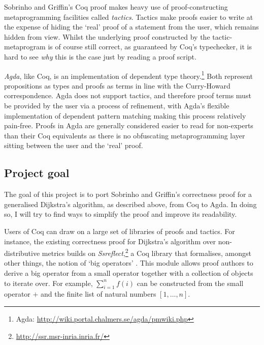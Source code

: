 \documentclass[a4paper]{scrartcl}
\begin{document}
Sobrinho and Griffin's Coq proof makes heavy use of proof-constructing metaprogramming facilities called \emph{tactics}.
Tactics make proofs easier to write at the expense of hiding the `real' proof of a statement from the user, which remains hidden from view.
Whilst the underlying proof constructed by the tactic-metaprogram is of course still correct, as guaranteed by Coq's typechecker, it is hard to see \emph{why} this is the case just by reading a proof script.

\emph{Agda}, like Coq, is an implementation of dependent type theory.\footnote{Agda: \url{http://wiki.portal.chalmers.se/agda/pmwiki.php}} Both represent propositions as types and proofs as terms in line with the Curry-Howard correspondence.
Agda does not support tactics, and therefore proof terms must be provided by the user via a process of refinement, with Agda's flexible implementation of dependent pattern matching making this process relatively pain-free. Proofs in Agda are generally considered easier to read for non-experts than their Coq equivalents as there is no obfuscating metaprogramming layer sitting between the user and the `real' proof.

\subsection{Project goal}

The goal of this project is to port Sobrinho and Griffin's correctness proof for a generalised Dijkstra's algorithm, as described above, from Coq to Agda.
In doing so, I will try to find ways to simplify the proof and improve its readability.

Users of Coq can draw on a large set of libraries of proofs and tactics.
For instance, the existing correctness proof for Dijkstra's algorithm over non-distributive metrics builds on \emph{Ssreflect},\footnote{\url{http://ssr.msr-inria.inria.fr/}} a Coq library that formalises, amongst other things, the notion of `big operators' \autocite{bertot_canonical_2008}. This module allows proof authors to derive a big operator from a small operator together with a collection of objects to iterate over. For example, \(\sum_{i=1}^n f(i)\) can be constructed from the small operator \(+\) and the finite list of natural numbers \([1, \dots, n]\).
\end{document}
